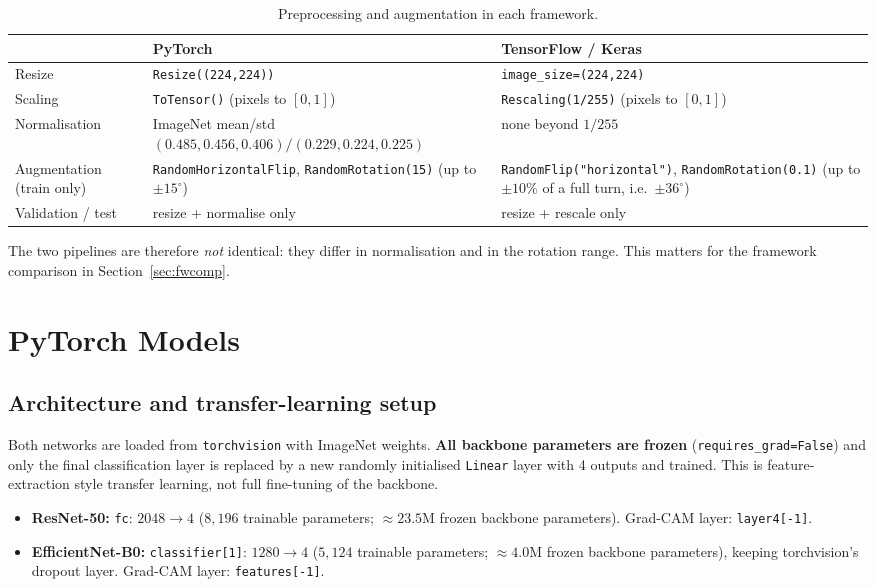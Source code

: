 \documentclass[11pt,a4paper]{article}
\begin{document}
\begin{table}[H]
\centering
\caption{Preprocessing and augmentation in each framework.}
\label{tab:preproc}
\begin{tabular}{p{3.3cm}p{5.6cm}p{5.6cm}}
\toprule
 & \textbf{PyTorch} & \textbf{TensorFlow / Keras} \\
\midrule
Resize        & \texttt{Resize((224,224))} & \texttt{image\_size=(224,224)} \\
Scaling       & \texttt{ToTensor()} (pixels to $[0,1]$) & \texttt{Rescaling(1/255)} (pixels to $[0,1]$) \\
Normalisation & ImageNet mean/std \newline $(0.485,0.456,0.406)/(0.229,0.224,0.225)$ & none beyond $1/255$ \\
Augmentation (train only) & \texttt{RandomHorizontalFlip}, \texttt{RandomRotation(15)} (up to $\pm15^\circ$) & \texttt{RandomFlip("horizontal")}, \texttt{RandomRotation(0.1)} (up to $\pm10\%$ of a full turn, i.e.\ $\pm36^\circ$) \\
Validation / test & resize + normalise only & resize + rescale only \\
\bottomrule
\end{tabular}
\end{table}

\noindent The two pipelines are therefore \emph{not} identical: they differ in normalisation and in the rotation range. This matters for the framework comparison in Section~\ref{sec:fwcomp}.

\section{PyTorch Models}
\subsection{Architecture and transfer-learning setup}
Both networks are loaded from \texttt{torchvision} with ImageNet weights. \textbf{All backbone parameters are frozen} (\texttt{requires\_grad=False}) and only the final classification layer is replaced by a new randomly initialised \texttt{Linear} layer with 4 outputs and trained. This is feature-extraction style transfer learning, not full fine-tuning of the backbone.

\begin{itemize}
  \item \textbf{ResNet-50:} \texttt{fc}: $2048\to4$ ($8{,}196$ trainable parameters; $\approx23.5$M frozen backbone parameters). Grad-CAM layer: \texttt{layer4[-1]}.
  \item \textbf{EfficientNet-B0:} \texttt{classifier[1]}: $1280\to4$ ($5{,}124$ trainable parameters; $\approx4.0$M frozen backbone parameters), keeping torchvision's dropout layer. Grad-CAM layer: \texttt{features[-1]}.
\end{itemize}
\end{document}
